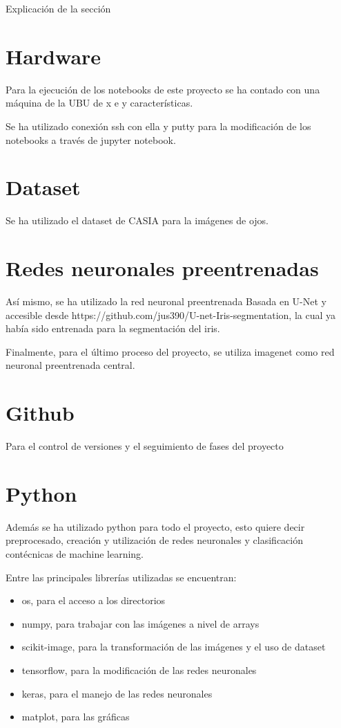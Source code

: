 
Explicación de la sección

\section{Hardware}

Para la ejecución de los notebooks de este proyecto se ha contado con una máquina de la UBU de x e y características.

Se ha utilizado conexión ssh con ella y putty para la modificación de los notebooks a través de jupyter notebook.

\section{Dataset}

Se ha utilizado el dataset de CASIA para la imágenes de ojos.

\section{Redes neuronales preentrenadas}

Así mismo, se ha utilizado la red neuronal preentrenada Basada en U-Net y accesible desde https://github.com/jus390/U-net-Iris-segmentation, la cual ya había sido
entrenada para la segmentación del iris.

Finalmente, para el último proceso del proyecto, se utiliza imagenet como red neuronal preentrenada central.

\section{Github}
Para el control de versiones y el seguimiento de fases del proyecto

\section{Python}

Además se ha utilizado python para todo el proyecto, esto quiere decir preprocesado, creación y utilización de redes neuronales y clasificación contécnicas de 
machine learning.

Entre las principales librerías utilizadas se encuentran:

\begin{itemize}
    \item os, para el acceso a los directorios
    \item numpy, para trabajar con las imágenes a nivel de arrays
    \item scikit-image, para la transformación de las imágenes y el uso de dataset
    \item tensorflow, para la modificación de las redes neuronales
    \item keras, para el manejo de las redes neuronales
    \item matplot, para las gráficas
\end{itemize}

